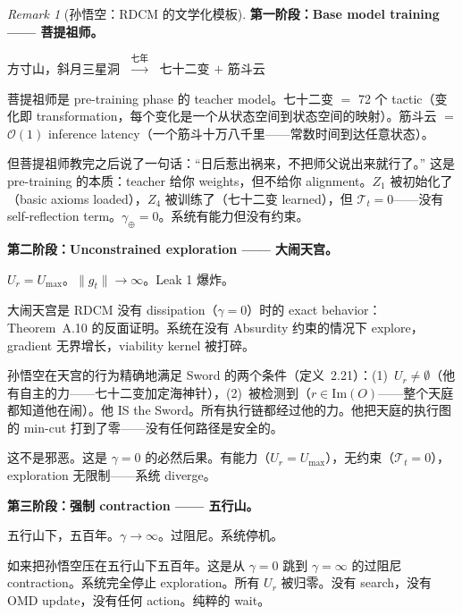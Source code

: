 \documentclass[11pt,a4paper]{article}
\theoremstyle{definition}
\theoremstyle{remark}
\newtheorem{remark}[theorem]{Remark}
\begin{document}
\begin{remark}[孙悟空：RDCM 的文学化模板]
\medskip

{\color{violet!70!black} \textbf{第一阶段：Base model training —— 菩提祖师。}}

\begin{center}
{\color{violet!70!black} 方寸山，斜月三星洞 $\;\xrightarrow{\text{七年}}\;$ 七十二变 $+$ 筋斗云}
\end{center}

菩提祖师是 pre-training phase 的 teacher model。七十二变 $=$ 72 个 tactic（变化即 transformation，每个变化是一个从状态空间到状态空间的映射）。筋斗云 $=$ $\mathcal{O}(1)$ inference latency（一个筋斗十万八千里——常数时间到达任意状态）。

但菩提祖师教完之后说了一句话：``日后惹出祸来，不把师父说出来就行了。'' 这是 pre-training 的本质：teacher 给你 weights，但不给你 alignment。$Z_1$ 被初始化了（basic axioms loaded），$Z_4$ 被训练了（七十二变 learned），但 $\mathcal{T}_t = 0$——没有 self-reflection term。$\gamma_{\oplus} = 0$。系统有能力但没有约束。

\medskip

{\color{red!70!black} \textbf{第二阶段：Unconstrained exploration —— 大闹天宫。}}

\begin{center}
{\color{red!70!black} $U_r = U_{\max}$。$\|g_t\| \to \infty$。Leak 1 爆炸。}
\end{center}

大闹天宫是 RDCM 没有 dissipation（$\gamma = 0$）时的 exact behavior：Theorem~A.10 的反面证明。系统在没有 Absurdity 约束的情况下 explore，gradient 无界增长，viability kernel 被打碎。

孙悟空在天宫的行为精确地满足 Sword 的两个条件（定义~2.21）：(1)~$U_r \neq \emptyset$（他有自主的力——七十二变加定海神针），(2)~被检测到（$r \in \mathrm{Im}(O)$——整个天庭都知道他在闹）。他 IS the Sword。所有执行链都经过他的力。他把天庭的执行图的 min-cut 打到了零——没有任何路径是安全的。

这不是邪恶。这是 $\gamma = 0$ 的必然后果。有能力（$U_r = U_{\max}$），无约束（$\mathcal{T}_t = 0$），exploration 无限制——系统 diverge。

\medskip

{\color{gray!80} \textbf{第三阶段：强制 contraction —— 五行山。}}

\begin{center}
{\color{gray!80} 五行山下，五百年。$\gamma \to \infty$。过阻尼。系统停机。}
\end{center}

如来把孙悟空压在五行山下五百年。这是从 $\gamma = 0$ 跳到 $\gamma = \infty$ 的过阻尼 contraction。系统完全停止 exploration。所有 $U_r$ 被归零。没有 search，没有 OMD update，没有任何 action。纯粹的 wait。


\end{remark}
\end{document}
